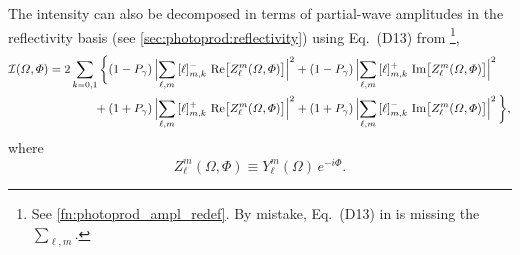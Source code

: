 The intensity can also be decomposed in terms of partial-wave
amplitudes in the reflectivity basis (see
\cref{sec:photoprod:reflectivity}) using Eq.~(D13) from
\footnote{See \cref{fn:photoprod_ampl_redef}.
By mistake, Eq.~(D13) in  is missing the
$\sum_{\ell, m}$.}, \ie
\begin{equation}
  \label{eq:zlm_photoprod}
  \begin{aligned}
  \intensity(\Omega, \Phi)
  = 2 \sum_{k = 0, 1} \bigg\{
         &(1 - P_\gamma)\, \Abs[2]{\sum_{\ell, m}\, [\ell]_{m, k}^{-}\, \Re[1]{Z_\ell^m(\Omega, \Phi)}}^2
      +   (1 - P_\gamma)\, \Abs[2]{\sum_{\ell, m}\, [\ell]_{m, k}^{+}\, \Im[1]{Z_\ell^m(\Omega, \Phi)}}^2
    \\
    {}+{}&(1 + P_\gamma)\, \Abs[2]{\sum_{\ell, m}\, [\ell]_{m, k}^{+}\, \Re[1]{Z_\ell^m(\Omega, \Phi)}}^2
      +   (1 + P_\gamma)\, \Abs[2]{\sum_{\ell, m}\, [\ell]_{m, k}^{-}\, \Im[1]{Z_\ell^m(\Omega, \Phi)}}^2
    \bigg\},
  \end{aligned}
\end{equation}
where
\begin{equation}
  Z_\ell^m(\Omega, \Phi)
  \equiv Y_\ell^m(\Omega)\, e^{-i \Phi}.
\end{equation}


